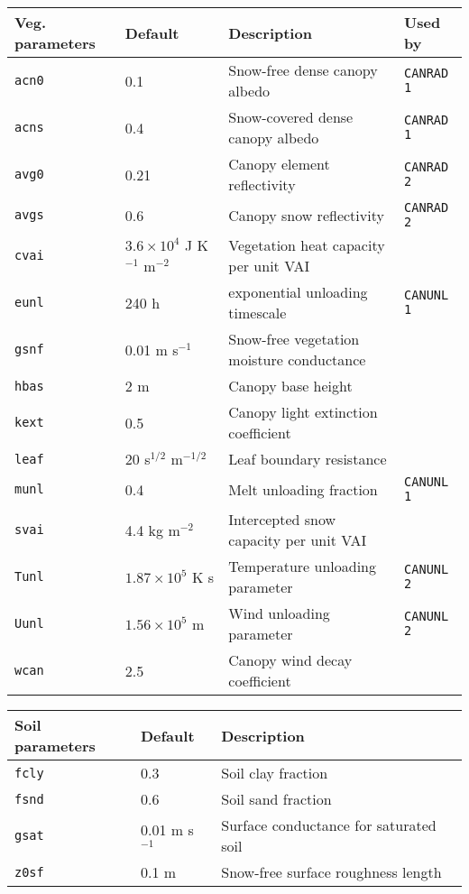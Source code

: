 \documentclass{article}
\begin{document}
\begin{longtable}{|l|l|l|l|} \hline
Veg. parameters       & Default       & Description                               &  Used by       \\ \hline
{\tt acn0} & 0.1                      & Snow-free dense canopy albedo             & {\tt CANRAD 1} \\
{\tt acns} & 0.4                      & Snow-covered dense canopy albedo          & {\tt CANRAD 1} \\  
{\tt avg0} & 0.21                     & Canopy element reflectivity               & {\tt CANRAD 2} \\
{\tt avgs} & 0.6                      & Canopy snow reflectivity                  & {\tt CANRAD 2} \\  
{\tt cvai} & $3.6\times 10^4$ J K$^{-1}$ m$^{-2}$ & Vegetation heat capacity per unit VAI &        \\
{\tt eunl} & 240 h                    & exponential unloading timescale           & {\tt CANUNL 1} \\
{\tt gsnf} & 0.01 m s$^{-1}$          & Snow-free vegetation moisture conductance &                \\
{\tt hbas} & 2 m                      & Canopy base height                        &                \\
{\tt kext} & 0.5                      & Canopy light extinction coefficient       &                \\
{\tt leaf} & 20 s$^{1/2}$ m$^{-1/2}$  & Leaf boundary resistance                  &                \\
{\tt munl} & 0.4                      & Melt unloading fraction                   & {\tt CANUNL 1} \\
{\tt svai} & 4.4 kg m$^{-2}$          & Intercepted snow capacity per unit VAI    &                \\
{\tt Tunl} & $1.87\times 10^5$ K s    & Temperature unloading parameter           & {\tt CANUNL 2} \\
{\tt Uunl} & $1.56\times 10^5$ m      & Wind unloading parameter                  & {\tt CANUNL 2} \\
{\tt wcan} & 2.5                      & Canopy wind decay coefficient             & \\ \hline
\end{longtable}

\begin{longtable}{|l|l|l|} \hline
Soil parameters  & Default         & Description                             \\ \hline
{\tt fcly}       & 0.3             & Soil clay fraction                      \\
{\tt fsnd}       & 0.6             & Soil sand fraction                      \\
{\tt gsat}       & 0.01 m s$^{-1}$ & Surface conductance for saturated soil  \\
{\tt z0sf}       & 0.1 m           & Snow-free surface roughness length      \\ \hline 
\end{longtable}
\end{document}
